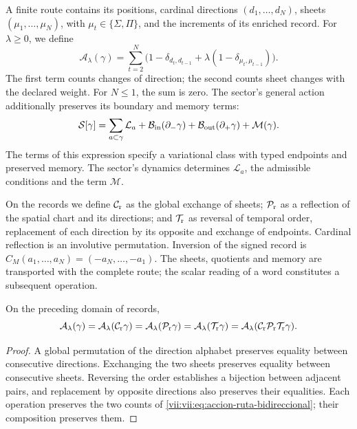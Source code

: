 A finite route contains its positions, cardinal directions
\((d_1,\ldots,d_N)\), sheets \((\mu_1,\ldots,\mu_N)\), with
\(\mu_t\in\{\Sigma,\Pi\}\), and the increments of its enriched
record. For \(\lambda\geq0\), we define
\begin{equation}
 \mathcal A_\lambda(\gamma)
 =\sum_{t=2}^N
 \bigl(1-\delta_{d_t,d_{t-1}}
       +\lambda(1-\delta_{\mu_t,\mu_{t-1}})\bigr).
 \label{vii:vii:eq:accion-ruta-bidireccional}
\end{equation}
The first term counts changes of direction; the second counts sheet
changes with the declared weight. For \(N\leq1\), the sum is zero.
The sector's general action additionally preserves its boundary and
memory terms:
\begin{equation}
 \mathcal S[\gamma]
 =\sum_{a\subset\gamma}\mathcal L_a
  +\mathcal B_{\rm in}(\partial_-\gamma)
  +\mathcal B_{\rm out}(\partial_+\gamma)
  +\mathcal M(\gamma).
 \label{vii:vii:eq:accion-enriquecida-frontera}
\end{equation}
The terms of this expression specify a variational class with
typed endpoints and preserved memory. The sector's dynamics determines
\(\mathcal L_a\), the admissible conditions and the term \(\mathcal M\).

On the records we define \(\mathcal C_{\rm r}\) as the global
exchange of sheets; \(\mathcal P_{\rm r}\) as a reflection of the spatial
chart and its directions; and \(\mathcal T_{\rm r}\) as reversal
of temporal order, replacement of each direction by its opposite and
exchange of endpoints. Cardinal reflection is an involutive permutation.
Inversion of the signed record is
\(C_M(a_1,\ldots,a_N)=(-a_N,\ldots,-a_1)\).
The sheets, quotients and memory are transported with the complete route;
the scalar reading of a word constitutes a subsequent operation.

\begin{proposition}
\label{vii:vii:prop:invariancia-ruta-bidireccional}
On the preceding domain of records,
\[
 \mathcal A_\lambda(\gamma)
 =\mathcal A_\lambda(\mathcal C_{\rm r}\gamma)
 =\mathcal A_\lambda(\mathcal P_{\rm r}\gamma)
 =\mathcal A_\lambda(\mathcal T_{\rm r}\gamma)
 =\mathcal A_\lambda(\mathcal C_{\rm r}\mathcal P_{\rm r}
                              \mathcal T_{\rm r}\gamma).
\]
\end{proposition}
\begin{proof}
A global permutation of the direction alphabet preserves equality
between consecutive directions. Exchanging the two sheets preserves
equality between consecutive sheets. Reversing the order establishes a
bijection between adjacent pairs, and replacement by opposite directions
also preserves their equalities. Each operation preserves the two counts
of \eqref{vii:vii:eq:accion-ruta-bidireccional}; their composition preserves them.
\end{proof}

